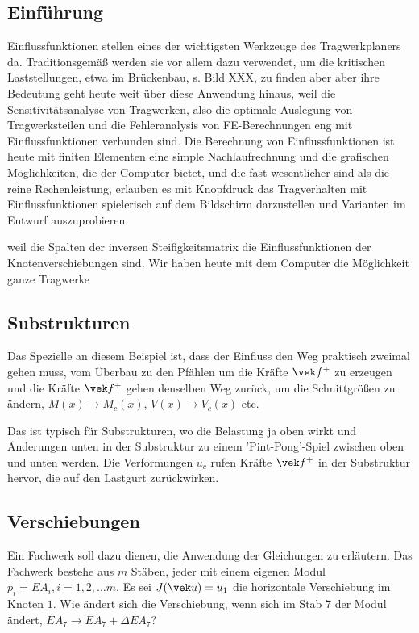 {{{{{%
{\textcolor{blau2}{\section{Einf\"{u}hrung}}}
Einflussfunktionen stellen eines der  wichtigsten Werkzeuge des Tragwerkplaners da. Traditionsgem\"{a}{\ss} werden sie vor allem dazu verwendet, um die kritischen Laststellungen, etwa im Br\"{u}ckenbau, s. Bild XXX, zu finden aber aber ihre Bedeutung geht heute weit \"{u}ber diese Anwendung hinaus, weil die Sensitivit\"{a}tsanalyse von Tragwerken, also die optimale Auslegung von Tragwerksteilen und die Fehleranalysis von FE-Berechnungen eng mit Einflussfunktionen verbunden sind. Die Berechnung von Einflussfunktionen ist heute mit finiten Elementen eine simple Nachlaufrechnung und die grafischen M\"{o}glichkeiten, die der Computer bietet, und die fast wesentlicher sind als die reine Rechenleistung, erlauben es mit Knopfdruck das Tragverhalten mit Einflussfunktionen spielerisch auf dem Bildschirm darzustellen und Varianten im Entwurf auszuprobieren.

 weil die Spalten der inversen Steifigkeitsmatrix die Einflussfunktionen der Knotenverschiebungen sind.   Wir haben heute mit dem Computer die M\"{o}glichkeit ganze Tragwerke


\textcolor{blau2}{\section{Substrukturen}}
Das Spezielle an diesem Beispiel ist, dass der Einfluss den Weg praktisch zweimal gehen muss, vom \"{U}berbau zu den Pf\"{a}hlen um die Kr\"{a}fte $\vek f^+$ zu erzeugen und die Kr\"{a}fte $\vek f^+$ gehen denselben Weg zur\"{u}ck, um die Schnittgr\"{o}{\ss}en zu \"{a}ndern, $M(x) \to M_c(x)$, $V(x) \to V_c(x)$ etc.

Das ist typisch f\"{u}r Substrukturen, wo die Belastung ja oben wirkt und \"{A}nderungen unten in der Substruktur zu einem 'Pint-Pong'-Spiel zwischen oben und unten werden. Die Verformungen $u_c$ rufen Kr\"{a}fte $\vek f^+$ in der Substruktur hervor, die auf den Lastgurt zur\"{u}ckwirken.


\textcolor{blau2}{\subsection{Verschiebungen}}
Ein Fachwerk soll dazu dienen, die Anwendung der Gleichungen zu erl\"{a}utern. Das Fachwerk bestehe aus $m$ St\"{a}ben, jeder mit einem eigenen Modul $p_i = EA_i, i = 1,2,\ldots m$. Es sei $J(\vek u) = u_1$ die horizontale Verschiebung im Knoten $1$. Wie \"{a}ndert sich die Verschiebung, wenn sich im Stab 7 der Modul \"{a}ndert, $EA_7 \to EA_7 + \Delta EA_7$?

}}}}}
